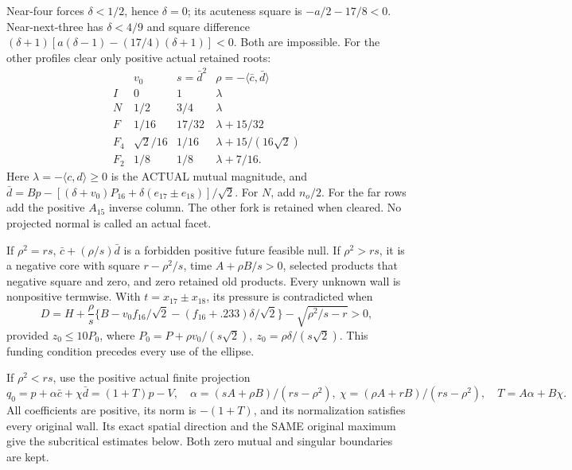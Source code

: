 \documentclass[11pt]{article}
\theoremstyle{definition}
\theoremstyle{remark}
\newcommand{\ip}[2]{\langle #1,#2\rangle}
\begin{document}
Near-four forces \(\delta<1/2\), hence \(\delta=0\);
its acuteness square is \(-a/2-17/8<0\).
Near-next-three has \(\delta<4/9\) and square difference
\((\delta+1)[a(\delta-1)-(17/4)(\delta+1)]<0\).
Both are impossible.
For the other profiles clear only positive actual retained roots:
\[
\begin{array}{c|c|c|c}
 &v_0&s=\bar d^2&\rho=-\ip{\bar c}{\bar d}\\ \hline
I&0&1&\lambda\\
N&1/2&3/4&\lambda\\
F&1/16&17/32&\lambda+15/32\\
F_4&\sqrt2/16&1/16&\lambda+15/(16\sqrt2)\\
F_2&1/8&1/8&\lambda+7/16 .
\end{array}
\]
Here \(\lambda=-\ip cd\geq0\) is the ACTUAL mutual magnitude,
and
\(\bar d=Bp-[(\delta+v_0)P_{16}
+\delta(e_{17}\pm e_{18})]/\sqrt2\).
For \(N\), add \(n_o/2\).
For the far rows add the positive \(A_{15}\) inverse column.
The other fork is retained when cleared.
No projected normal is called an actual facet.

If \(\rho^2=rs\), \(\bar c+(\rho/s)\bar d\) is a forbidden
positive future feasible null.
If \(\rho^2>rs\), it is a negative core with square
\(r-\rho^2/s\), time \(A+\rho B/s>0\), selected products
that negative square and zero, and zero retained old products.
Every unknown wall is nonpositive termwise.
With \(t=x_{17}\pm x_{18}\), its pressure is contradicted when
\begin{equation}\label{eq:D18puregap}
 D=H+\frac{\rho}{s}
 \{B-v_0f_{16}/\sqrt2-(f_{16}+.233)\delta/\sqrt2\}
       -\sqrt{\rho^2/s-r}>0 ,
\end{equation}
provided \(z_0\leq10P_0\), where
\(P_0=P+\rho v_0/(s\sqrt2),\
z_0=\rho\delta/(s\sqrt2)\).
This funding condition precedes every use of the ellipse.

If \(\rho^2<rs\), use the positive actual finite projection
\[
 q_0=p+\alpha\bar c+\chi\bar d=(1+T)p-V,\quad
 \alpha=(sA+\rho B)/(rs-\rho^2),\
 \chi=(\rho A+rB)/(rs-\rho^2),\quad T=A\alpha+B\chi .
\]
All coefficients are positive, its norm is \(-(1+T)\), and its
normalization satisfies every original wall.
Its exact spatial direction and the SAME original maximum give
the subcritical estimates below. Both zero mutual and singular
boundaries are kept.
\end{document}
